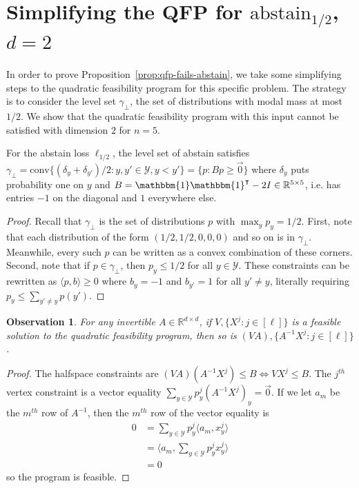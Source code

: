 \documentclass[final]{colt2020} %
\newcommand{\reals}{\mathbb{R}}
\newcommand{\abstain}[1]{\mathrm{abstain}_{#1}}
\newcommand{\Y}{\mathcal{Y}}
\newcommand{\inprod}[2]{\langle #1, #2 \rangle}%
\newcommand{\conv}{\mathrm{conv}}
\newcommand{\ones}{\mathbbm{1}}
\newtheorem{observation}{Observation}
\begin{document}
\section{Simplifying the QFP for $\abstain{1/2}$, $d=2$}
In order to prove Proposition~\ref{prop:qfp-fails-abstain}, we take some simplifying steps to the quadratic feasibility program for this specific problem.
The strategy is to consider the level set $\gamma_{\bot}$, the set of distributions with modal mass at most $1/2$.
We show that the quadratic feasibility program with this input cannot be satisfied with dimension $2$ for $n=5$.

\begin{lemma} \label{lemma:abstain-v-h}
	For the abstain loss $\ell_{1/2}$, the level set of abstain satisfies $\gamma_{\bot} = \conv\{(\delta_y + \delta_{y'})/2 : y,y' \in \Y, y < y'\} = \{p : Bp \geq \vec{0}\}$ where $\delta_y$ puts probability one on $y$ and $B = \ones \ones^{\intercal} - 2I \in \reals^{5 \times 5}$, i.e. has entries $-1$ on the diagonal and $1$ everywhere else.
\end{lemma}
\begin{proof}
	Recall that $\gamma_{\bot}$ is the set of distributions $p$ with $\max_y p_y = 1/2$.
	First, note that each distribution of the form $(1/2, 1/2, 0, 0, 0)$ and so on is in $\gamma_{\bot}$.
	Meanwhile, every such $p$ can be written as a convex combination of these corners.
	Second, note that if $p \in \gamma_{\bot}$, then $p_y \leq 1/2$ for all $y \in \Y$.
	These constraints can be rewritten as $\inprod{p}{b} \geq 0$ where $b_y = -1$ and $b_{y'} = 1$ for all $y' \neq y$, literally requiring $p_y \leq \sum_{y' \neq y} p(y')$.
\end{proof}

\begin{observation} \label{obs:qfp-invariant-lin}
	For any invertible $A \in \reals^{d \times d}$, if $V,\{X^j : j \in [\ell]\}$ is a feasible solution to the quadratic feasibility program, then so is $(VA),\{A^{-1}X^j : j \in [\ell]\}$.
\end{observation}
\begin{proof}
	The halfspace constraints are $(VA)(A^{-1}X^j) \leq B \iff VX^{j} \leq B$.
	The $j^{th}$ vertex constraint is a vector equality $\sum_{y \in \Y} p^j_y (A^{-1}X^j)_y = \vec{0}$.
	If we let $a_m$ be the $m^{th}$ row of $A^{-1}$, then the $m^{th}$ row of the vector equality is
	\begin{align*}
	0 &= \sum_{y \in \Y} p^j_y \inprod{a_m}{x^j_y}  \\
	&= \inprod{a_m}{\sum_{y \in \Y} p^j_y x^j_y}  \\
	&= 0
	\end{align*}
	so the program is feasible.
\end{proof}
\end{document}
